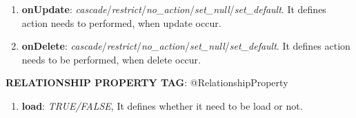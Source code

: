 \begin{enumerate}
\begin{enumerate}
			\item \small \textbf{onUpdate}: \textit{cascade}/\textit{restrict}/\textit{no\_action}/\textit{set\_null}/\textit{set\_default}. It defines action needs to performed, when update occur. 
			\item \small \textbf{onDelete}: \textit{cascade}/\textit{restrict}/\textit{no\_action}/\textit{set\_null}/\textit{set\_default}. It defines action needs to be performed, when delete occur.		

		\end{enumerate}

	\par
		\textbf{RELATIONSHIP PROPERTY TAG}: @RelationshipProperty

			\begin{enumerate}

				\item \small \textbf{load}: \textit{TRUE/FALSE}, It defines whether it need to be load or not.	

			\end{enumerate}


\end{enumerate}
